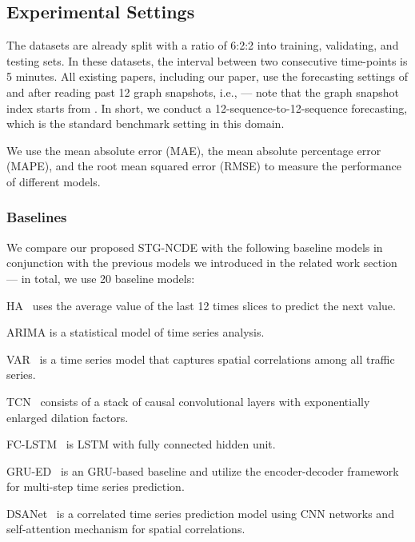 \documentclass[letterpaper]{article} \usepackage{aaai22}  \usepackage{times}  \usepackage{helvet}  \usepackage{courier}  \usepackage[hyphens]{url}  \usepackage{graphicx} \urlstyle{rm} \def\UrlFont{\rm}  \usepackage{natbib}  \usepackage{caption} \DeclareCaptionStyle{ruled}{labelfont=normalfont,labelsep=colon,strut=off} \frenchspacing  \setlength{\pdfpagewidth}{8.5in}  \setlength{\pdfpageheight}{11in}  \usepackage{stfloats}
\begin{document}
\subsection{Experimental Settings}
The datasets are already split with a ratio of 6:2:2 into training, validating, and testing sets. In these datasets, the interval between two consecutive time-points is 5 minutes. All existing papers, including our paper, use the forecasting settings of  and  after reading past 12 graph snapshots, i.e.,  --- note that the graph snapshot index  starts from . In short, we conduct a 12-sequence-to-12-sequence forecasting, which is the standard benchmark setting in this domain.

We use the mean absolute error (MAE), the mean absolute percentage error (MAPE), and the root mean squared error (RMSE) to measure the performance of different models.
\subsubsection{Baselines}
We compare our proposed STG-NCDE with the following baseline models in conjunction with the previous models we introduced in the related work section --- in total, we use 20 baseline models:
\begin{compactenum}
    \item HA~\cite{hamilton2020time} uses the average value of the last 12 times slices to predict the next value.
    \item ARIMA is a statistical model of time series analysis.
    \item VAR~\cite{hamilton2020time} is a time series model that captures spatial correlations among all traffic series.
    \item TCN~\cite{BaiTCN2018} consists of a stack of causal convolutional layers with exponentially enlarged dilation factors.
\item FC-LSTM~\cite{sutskever2014sequence} is LSTM with fully connected hidden unit.
    \item GRU-ED~\cite{cho2014grued} is an GRU-based baseline and utilize the encoder-decoder framework for multi-step time series prediction.
    \item DSANet~\cite{Huang2019DSANet} is a correlated time series prediction model using CNN networks and self-attention mechanism for spatial correlations.
\end{compactenum}
\end{document}
